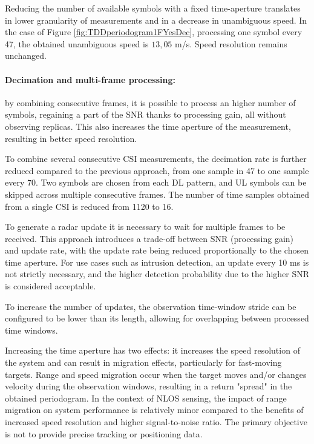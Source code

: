     Reducing the number of available symbols with a fixed time-aperture translates in lower granularity of measurements and in a decrease in unambiguous speed. \protect\newline In the case of Figure \ref{fig:TDDperiodogram1FYesDec}, processing one symbol every 47, the obtained unambiguous speed is $13,05$ m/s. \protect\newline Speed resolution remains unchanged.
    
     \paragraph{Decimation and multi-frame processing:}
     by combining consecutive frames, it is possible to process an higher number of symbols, regaining a part of the SNR thanks to processing gain, all without observing replicas. 
     This also increases the time aperture of the measurement, resulting in better speed resolution.
     
	 To combine several consecutive CSI measurements, the decimation rate is further reduced compared to the previous approach, from one sample in 47 to one sample every 70. 
	 Two symbols are chosen from each DL pattern, and UL symbols can be skipped across multiple consecutive frames.
	 The number of time samples obtained from a single CSI is reduced from 1120 to 16.
	 
	 To generate a radar update it is necessary to wait for multiple frames to be received.
	 This approach introduces a trade-off between SNR (processing gain) and update rate, with the update rate being reduced proportionally to the chosen time aperture.
     For use cases such as intrusion detection, an update every 10 ms is not strictly necessary, and the higher detection probability due to the higher SNR is considered acceptable.
          
     To increase the number of updates, the observation time-window stride can be configured to be lower than its length, allowing for overlapping between processed time windows.
      
     Increasing the time aperture has two effects: it increases the speed resolution of the system and can result in migration effects, particularly for fast-moving targets. 
     Range and speed migration occur when the target moves and/or changes velocity during the observation windows, resulting in a return "spread" in the obtained periodogram.
     In the context of NLOS sensing, the impact of range migration on system performance is relatively minor compared to the benefits of increased speed resolution and higher signal-to-noise ratio. The primary objective is not to provide precise tracking or positioning data.
	
